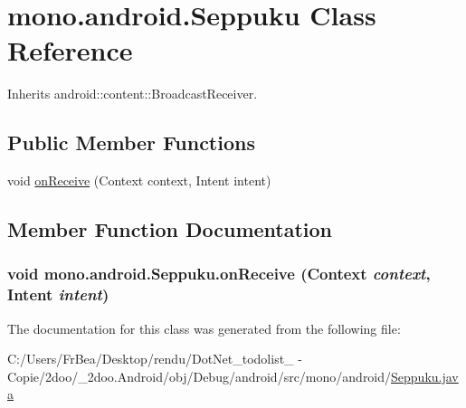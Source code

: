 \hypertarget{classmono_1_1android_1_1_seppuku}{
\section{mono.android.Seppuku Class Reference}
\label{classmono_1_1android_1_1_seppuku}
}
Inherits android::content::BroadcastReceiver.

\subsection*{Public Member Functions}
\begin{CompactItemize}
\item 
void \hyperlink{classmono_1_1android_1_1_seppuku_bf493c6888eae9735c6b1fd052c25a2a}{onReceive} (Context context, Intent intent)
\end{CompactItemize}


\subsection{Member Function Documentation}
\hypertarget{classmono_1_1android_1_1_seppuku_bf493c6888eae9735c6b1fd052c25a2a}{
\subsubsection[{onReceive}]{\setlength{\rightskip}{0pt plus 5cm}void mono.android.Seppuku.onReceive (Context {\em context}, \/  Intent {\em intent})}}
\label{classmono_1_1android_1_1_seppuku_bf493c6888eae9735c6b1fd052c25a2a}




The documentation for this class was generated from the following file:\begin{CompactItemize}
\item 
C:/Users/FrBea/Desktop/rendu/DotNet\_\-todolist\_ - Copie/2doo/\_\-2doo.Android/obj/Debug/android/src/mono/android/\hyperlink{_seppuku_8java}{Seppuku.java}\end{CompactItemize}
